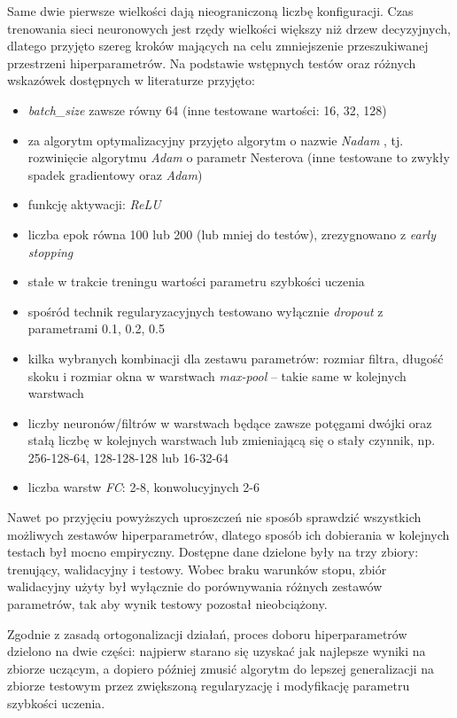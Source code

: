 Same dwie pierwsze wielkości dają nieograniczoną liczbę konfiguracji. 
Czas trenowania sieci neuronowych jest rzędy wielkości większy niż drzew decyzyjnych, dlatego przyjęto szereg kroków mających na celu zmniejszenie przeszukiwanej przestrzeni hiperparametrów. Na podstawie wstępnych testów oraz różnych wskazówek dostępnych w literaturze przyjęto:
\begin{itemize}
	\item \textit{batch\_size} zawsze równy 64 (inne testowane wartości: 16, 32, 128)
	\item za algorytm optymalizacyjny przyjęto algorytm o nazwie \textit{Nadam} \cite{Nadam}, tj. rozwinięcie algorytmu \textit{Adam} \cite{KingmaB14} o parametr Nesterova (inne testowane to zwykły spadek gradientowy oraz \textit{Adam})
	\item funkcję aktywacji: \textit{ReLU}
	\item liczba epok równa 100 lub 200 (lub mniej do testów), zrezygnowano z \textit{early stopping}
	\item stałe w trakcie treningu wartości parametru szybkości uczenia 
	\item spośród technik regularyzacyjnych testowano wyłącznie \textit{dropout} \cite{srivastava14} z parametrami 0.1, 0.2, 0.5
	\item kilka wybranych kombinacji dla zestawu parametrów: rozmiar filtra, długość skoku i rozmiar okna w warstwach \textit{max-pool} -- takie same w kolejnych warstwach
	\item liczby neuronów/filtrów w warstwach będące zawsze potęgami dwójki oraz stałą liczbę w kolejnych warstwach lub zmieniającą się o stały czynnik, np. 256-128-64, 128-128-128 lub 16-32-64
	\item liczba warstw \textit{FC}: 2-8, konwolucyjnych 2-6
\end{itemize}

Nawet po przyjęciu powyższych uproszczeń nie sposób sprawdzić wszystkich możliwych zestawów hiperparametrów, dlatego sposób ich dobierania w kolejnych testach był mocno empiryczny. 
Dostępne dane dzielone były na trzy zbiory: trenujący, walidacyjny i testowy. Wobec braku warunków stopu, zbiór walidacyjny użyty był wyłącznie do porównywania różnych zestawów parametrów, tak aby wynik testowy pozostał nieobciążony.

Zgodnie z zasadą ortogonalizacji działań, proces doboru hiperparametrów dzielono na dwie części: najpierw starano się uzyskać jak najlepsze wyniki na zbiorze uczącym, a dopiero później zmusić algorytm do lepszej generalizacji na zbiorze testowym przez zwiększoną regularyzację i modyfikację parametru szybkości uczenia. 

